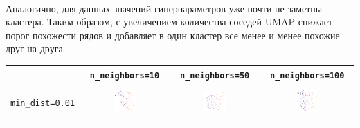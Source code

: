 \begin{tabular}{c|c|c|c|c}
\end{tabular}\\[2mm]

Аналогично, для данных значений гиперпараметров уже почти не заметны кластера. Таким образом, с увеличением количества соседей UMAP снижает порог похожести рядов и добавляет в один кластер все менее и менее похожие друг на друга.

\begin{tabular}{c|c|c|c}
\arrayrulecolor[rgb]{0.8,0.85,1}
	& \verb|n_neighbors=10| & \verb|n_neighbors=50| & \verb|n_neighbors=100|\\
	\hline
	\begin{sideways} \verb|min_dist=0.01| \end{sideways} & \includegraphics*[width = 0.27\textwidth]{min=0,01,n=10.png} & \includegraphics*[width = 0.27\textwidth]{min=0,01,n=50.png} & \includegraphics*[width = 0.27\textwidth]{min=0,01,n=100.png}\\
	\hline

\end{tabular}
